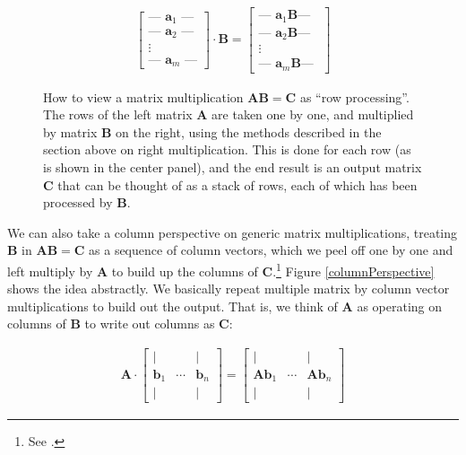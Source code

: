 \begin{align*}
\begin{bmatrix}
\text{--- } \mathbf{a}_1 \text{ ---} \\
\text{--- } \mathbf{a}_2 \text{ ---} \\
\vdots \\
\text{--- } \mathbf{a}_m \text{ ---}
\end{bmatrix}
\cdot
\mathbf{B}
=
\begin{bmatrix}
\text{--- } \mathbf{a}_1 \mathbf{B} \text{--- } \\
\text{--- } \mathbf{a}_2 \mathbf{B} \text{--- } \\
\vdots \\
\text{--- } \mathbf{a}_m \mathbf{B} \text{--- }
\end{bmatrix}
\end{align*}

\begin{figure}[h]
\centering
{}
\caption[Jeff Yoshimi.]{How to view a matrix multiplication  $\mathbf{A}\mathbf{B} = \mathbf{C}$ as ``row processing''. The rows of the left matrix $\mathbf{A}$ are taken one by one, and multiplied by matrix $\mathbf{B}$  on the right, using the methods described in the section above on right multiplication. This is done for each row (as is shown in the center panel), and the end result is an output matrix $\mathbf{C}$ that can be thought of as a stack of rows, each of which has been processed by $\mathbf{B}$.}
\label{rowPerspective}
\end{figure} 

We can also take a column perspective on generic matrix multiplications, treating $\mathbf{B}$ in $\mathbf{A}\mathbf{B} = \mathbf{C}$ as a sequence of column vectors, which we peel off one by one and left multiply by $\mathbf{A}$ to build up the columns of $\mathbf{C}$.\footnote{See .}  Figure \ref{columnPerspective} shows the idea abstractly. We basically repeat multiple matrix by column vector multiplications to build out the output. That is, we think of $\mathbf{A}$ as operating on columns of $\mathbf{B}$ to write out columns as $\mathbf{C}$:

\begin{align*}
\mathbf{A} \cdot
\begin{bmatrix}
\vert &        & \vert \\
\mathbf{b}_1 & \cdots & \mathbf{b}_n \\
\vert &        & \vert
\end{bmatrix}
=
\begin{bmatrix}
\vert &        & \vert \\
\mathbf{A} \mathbf{b}_1 & \cdots & \mathbf{A} \mathbf{b}_n \\
\vert &        & \vert
\end{bmatrix}
\end{align*}

